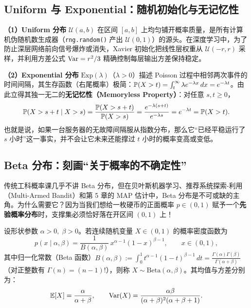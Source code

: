\subsection{Uniform 与 Exponential：随机初始化与无记忆性}

\textbf{（1）Uniform 分布} $\mathcal{U}(a, b)$ 在区间 $[a, b]$ 上均匀铺开概率质量，是所有计算机伪随机数生成器（\texttt{rng.random()} 产出 $\mathcal{U}(0, 1)$）的源头。在深度学习中，为了防止深层网络前向信号爆炸或消失，Xavier 初始化把线性层权重从 $\mathcal{U}(-r, r)$ 采样，并利用方差公式 $\operatorname{Var} = r^2 / 3$ 精确控制每层输出方差保持稳定。

\textbf{（2）Exponential 分布} $\mathrm{Exp}(\lambda)$（$\lambda > 0$）描述 Poisson 过程中相邻两次事件的时间间隔，其生存函数（右尾概率）极简：$\mathbb{P}(X > t) = \int_t^\infty \lambda e^{-\lambda x}\,dx = e^{-\lambda t}$。由此立得其独一无二的\textbf{无记忆性（Memoryless Property）}：对任意 $s, t \ge 0$，
\[
  \mathbb{P}(X > s + t \mid X > s) = \frac{\mathbb{P}(X > s + t)}{\mathbb{P}(X > s)} = \frac{e^{-\lambda(s+t)}}{e^{-\lambda s}} = e^{-\lambda t} = \mathbb{P}(X > t).
\]
也就是说，如果一台服务器的无故障间隔服从指数分布，那么它“已经平稳运行了 $s$ 小时”这一事实，并不会让它未来还能撑过 $t$ 小时的概率变高或变低。

\subsection{Beta 分布：刻画“关于概率的不确定性”}

传统工科概率课几乎不讲 Beta 分布，但在贝叶斯机器学习、推荐系统探索-利用（Multi-Armed Bandit）和第 5 章的 MAP 估计中，Beta 分布是不可或缺的主角。为什么需要它？因为当我们想给一枚硬币的正面概率 $p \in (0, 1)$ 赋予一个\textbf{先验概率分布}时，支撑集必须恰好落在开区间 $(0, 1)$ 上！

\begin{defBox}
\begin{definition}[Beta 分布]
\label{def:ch2-beta}
设形状参数 $\alpha > 0,\; \beta > 0$。若连续随机变量 $X \in (0, 1)$ 的概率密度函数为
\begin{equation}
  p(x \mid \alpha, \beta) = \frac{1}{B(\alpha, \beta)}\, x^{\alpha - 1}(1 - x)^{\beta - 1}, \qquad x \in (0, 1), \label{eq:ch2-beta}
\end{equation}
其中归一化常数（Beta 函数）$B(\alpha, \beta) := \int_0^1 t^{\alpha-1}(1-t)^{\beta-1}\,dt = \frac{\Gamma(\alpha)\Gamma(\beta)}{\Gamma(\alpha+\beta)}$（对正整数有 $\Gamma(n) = (n-1)!$），则称 $X \sim \mathrm{Beta}(\alpha, \beta)$。其均值与方差分别为：
\begin{equation}
  \mathbb{E}[X] = \frac{\alpha}{\alpha + \beta}, \qquad
  \operatorname{Var}(X) = \frac{\alpha\beta}{(\alpha+\beta)^2(\alpha+\beta+1)}. \label{eq:ch2-beta-moments}
\end{equation}
\end{definition}
\end{defBox}

